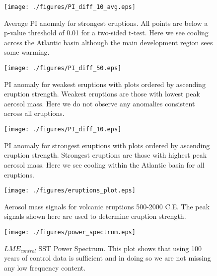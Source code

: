 \documentclass[smallextended]{svjour3}       %
\begin{document}
\begin{figure}[!tbp]
\centering
\texttt{[image: ./figures/PI\_diff\_10\_avg.eps]}
\caption{Average PI anomaly for strongest eruptions. All points are below a p-value threshold of 0.01 for a two-sided t-test. Here we see cooling across the Atlantic basin although the main development region sees some warming.}
\label{pi_10_avg}
\end{figure}

\begin{figure}[!tbp]
\centering
\texttt{[image: ./figures/PI\_diff\_50.eps]}
\caption{PI anomaly for weakest eruptions with plots ordered by ascending eruption strength. Weakest eruptions are those with lowest peak aerosol mass. Here we do not observe any anomalies consistent across all eruptions.}
\label{pi_10_wk}
\end{figure}

\begin{figure}[!tbp]
\centering
\texttt{[image: ./figures/PI\_diff\_10.eps]}
\caption{PI anomaly for strongest eruptions with plots ordered by ascending eruption strength. Strongest eruptions are those with highest peak aerosol mass. Here we see cooling within the Atlantic basin for all eruptions.}
\label{pi_10_str}
\end{figure}

\begin{figure}[!tbp]
\centering
\begin{minipage}[b]{0.45\textwidth}
\texttt{[image: ./figures/eruptions\_plot.eps]}
\caption{Aerosol mass signals for volcanic eruptions 500-2000 C.E. The peak signals shown here are used to determine eruption strength. }
\label{erups_plot}
\end{minipage}
\hfill
\begin{minipage}[b]{0.45\textwidth}
\texttt{[image: ./figures/power\_spectrum.eps]}
\caption{$LME_{control}$ SST Power Spectrum. This plot shows that using 100 years of control data is sufficient and in doing so we are not missing any low frequency content.}
\label{spectrum}
\end{minipage}
\end{figure}

\end{document}
